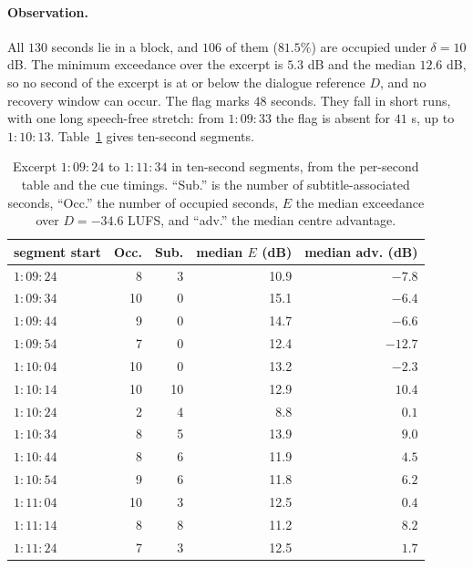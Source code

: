 \paragraph{Observation.} All $130$ seconds lie in a block, and $106$ of them ($81.5\%$) are occupied under $\delta=10$ dB. The minimum exceedance over the excerpt is $5.3$ dB and the median $12.6$ dB, so no second of the excerpt is at or below the dialogue reference $D$, and no recovery window can occur. The flag marks $48$ seconds. They fall in short runs, with one long speech-free stretch: from $1{:}09{:}33$ the flag is absent for $41$ s, up to $1{:}10{:}13$. Table~\ref{tab:excerpt} gives ten-second segments.

\begin{table}[ht]
\centering\small
\caption{Excerpt $1{:}09{:}24$ to $1{:}11{:}34$ in ten-second segments, from the per-second table and the cue timings. ``Sub.'' is the number of subtitle-associated seconds, ``Occ.'' the number of occupied seconds, $E$ the median exceedance over $D=-34.6$ LUFS, and ``adv.'' the median centre advantage.}\label{tab:excerpt}
\begin{tabular}{lrrrr}
\toprule
segment start & Occ. & Sub. & median $E$ (dB) & median adv. (dB)\\
\midrule
$1{:}09{:}24$ & 8 & 3 & 10.9 & $-7.8$\\
$1{:}09{:}34$ & 10 & 0 & 15.1 & $-6.4$\\
$1{:}09{:}44$ & 9 & 0 & 14.7 & $-6.6$\\
$1{:}09{:}54$ & 7 & 0 & 12.4 & $-12.7$\\
$1{:}10{:}04$ & 10 & 0 & 13.2 & $-2.3$\\
$1{:}10{:}14$ & 10 & 10 & 12.9 & $10.4$\\
$1{:}10{:}24$ & 2 & 4 & 8.8 & $0.1$\\
$1{:}10{:}34$ & 8 & 5 & 13.9 & $9.0$\\
$1{:}10{:}44$ & 8 & 6 & 11.9 & $4.5$\\
$1{:}10{:}54$ & 9 & 6 & 11.8 & $6.2$\\
$1{:}11{:}04$ & 10 & 3 & 12.5 & $0.4$\\
$1{:}11{:}14$ & 8 & 8 & 11.2 & $8.2$\\
$1{:}11{:}24$ & 7 & 3 & 12.5 & $1.7$\\
\bottomrule
\end{tabular}
\end{table}


